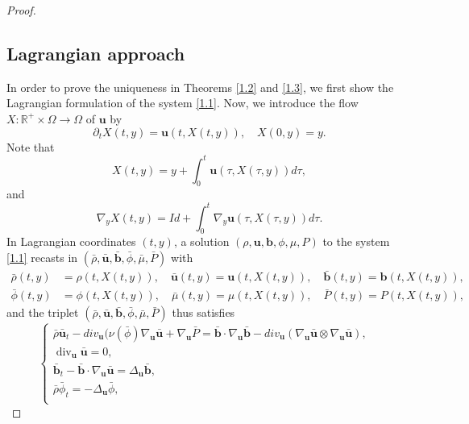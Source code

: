 \documentclass[11pt]{article}
\numberwithin{equation}{section}
\begin{document}
\begin{proof}
\subsection{Lagrangian approach}
\label{proofT}


In order to prove  the  uniqueness in  Theorems \ref{1.2} and \ref{1.3}, we first show the Lagrangian formulation of the system  \eqref{1.1}.
Now, we introduce the flow \( X : \mathbb{R}^+ \times \Omega \to \Omega\) of \( \mathbf{u} \) by
\begin{equation*}
\partial_t X(t, y) = \mathbf{u}(t, X(t, y)), \quad X(0, y) = y.
\end{equation*}
Note that
\begin{equation*}
X(t, y) = y + \int_0^t \mathbf{u}(\tau, X(\tau, y)) d\tau,
\end{equation*}
and
\begin{equation*}
\nabla_y X(t, y) = Id + \int_0^t \nabla_y \mathbf{u}(\tau, X(\tau, y)) d\tau.
\end{equation*}
In Lagrangian coordinates \((t, y)\), a solution \((\rho, \mathbf{u}, \mathbf{b}, \phi,\mu, P)\) to the system \eqref{1.1} recasts in \((\bar{\rho}, \bar{\mathbf{u}}, \bar{\mathbf{b}}, \bar{\phi},\bar{\mu}, \bar{P})\) with
\begin{equation}
\begin{split}
\bar{\rho}(t, y) &= \rho(t, X(t, y)), \quad \bar{\mathbf{u}}(t, y) = \mathbf{u}(t, X(t, y)), \quad \bar{\mathbf{b}}(t, y) = \mathbf{b}(t, X(t, y)),\\
\bar{\phi}(t, y) &= \phi(t, X(t, y)),\quad \bar{\mu}(t, y) = \mu(t, X(t, y)),\quad \bar{P}(t, y) = P(t, X(t, y)),
\end{split}
\end{equation}
and the triplet \((\bar{\rho}, \bar{\mathbf{u}}, \bar{\mathbf{b}}, \bar{\phi},\bar{\mu},\bar{P})\) thus satisfies
\begin{equation}
\begin{cases}
\bar{\rho} \bar{\mathbf{u}}_t - div_\mathbf{u}(\nu(\bar{\phi})\nabla_\mathbf{u}\bar{\mathbf{u}}+ \nabla_\mathbf{u} \bar{P} = \bar{\mathbf{b}}\cdot\nabla_\mathbf{u}\bar{\mathbf{b}}
-div_\mathbf{u}(\nabla_\mathbf{u}\bar{\mathbf{u}}\otimes\nabla_\mathbf{u}\bar{\mathbf{u}}), \label{eq-z}
\\
\operatorname{div}_\mathbf{u} \bar{\mathbf{u}} = 0 , \\
\bar{\mathbf{b}}_t-\bar{\mathbf{b}}\cdot\nabla_\mathbf{u}\bar{\mathbf{u}} = \Delta_\mathbf{u}\bar{\mathbf{b}},\\
\bar{\rho} \bar{\phi}_t = -\Delta_\mathbf{u}\bar{\phi},&  \\

\end{cases}
\end{equation}
\end{proof}
\end{document}
